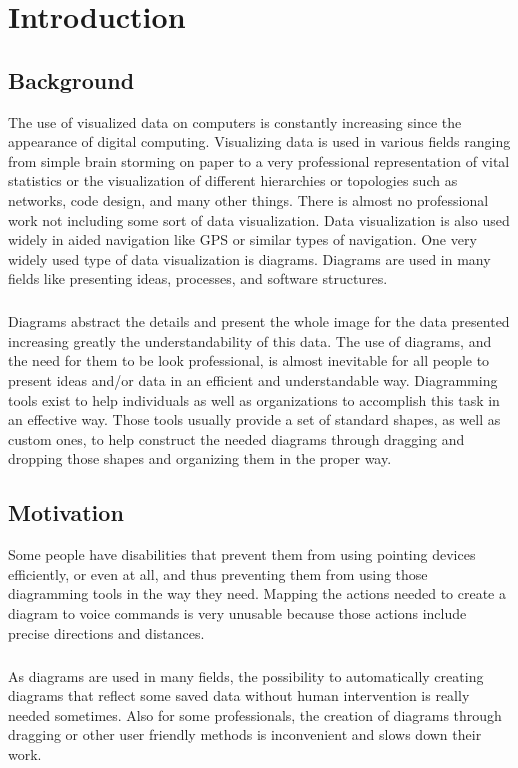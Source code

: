 \chapter{Introduction}
\beginchapter
\section{Background}
The use of visualized data on computers is constantly increasing since the appearance of digital computing. Visualizing data is used in various fields ranging from simple brain storming on paper to a very professional representation of vital statistics or the visualization of different hierarchies or topologies such as networks, code design, and many other things. There is almost no professional work not including some sort of data visualization.
Data visualization is also used widely in aided navigation like GPS or similar types of navigation.
One very widely used type of data visualization is diagrams. Diagrams are used in many fields like presenting ideas, processes, and software structures.

\paragraph{}
Diagrams abstract the details and present the whole image for the data presented increasing greatly the understandability of this data. The use of diagrams, and the need for them to be look professional, is almost inevitable for all people to present ideas and/or data in an efficient and understandable way. Diagramming tools exist to help individuals as well as organizations to accomplish this task in an effective way. Those tools usually provide a set of standard shapes, as well as custom ones, to help construct the needed diagrams through dragging and dropping those shapes and organizing them in the proper way.

\section{Motivation}
Some people have disabilities that prevent them from using pointing devices efficiently, or even at all, and thus preventing them from using those diagramming tools in the way they need. Mapping the actions needed to create a diagram to voice commands is very unusable because those actions include precise directions and distances.

\paragraph{}
As diagrams are used in many fields, the possibility to automatically creating diagrams that reflect some saved data without human intervention is really needed sometimes. Also for some professionals, the creation of diagrams through dragging or other user friendly methods is inconvenient and slows down their work.


